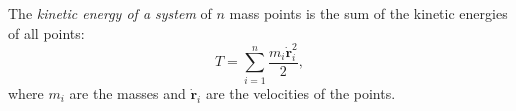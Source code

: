 The \textit{kinetic energy of a system} of $n$ mass points is the sum of the kinetic energies of all points:
$$T = \sum_{i=1}^{n} \frac{m_i \dot{\mathbf{r}}_i^2}{2},$$
where $m_i$ are the masses and $\dot{\mathbf{r}}_i$ are the velocities of the points.
